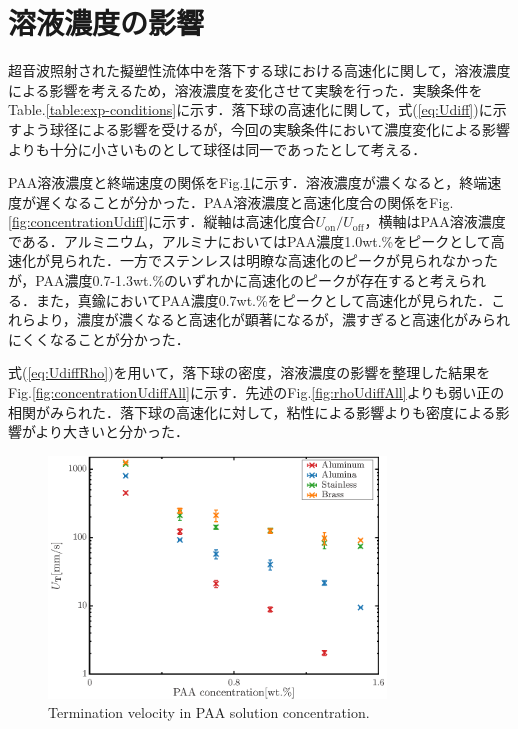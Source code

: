 \section{溶液濃度の影響}
\label{sec:concentration}
超音波照射された擬塑性流体中を落下する球における高速化に関して，溶液濃度による影響を考えるため，溶液濃度を変化させて実験を行った．実験条件をTable.\ref{table:exp-conditions}に示す．落下球の高速化に関して，式(\ref{eq:Udiff})に示すよう球径による影響を受けるが，今回の実験条件において濃度変化による影響よりも十分に小さいものとして球径は同一であったとして考える．

PAA溶液濃度と終端速度の関係をFig.\ref{fig:concentrationUT}に示す．溶液濃度が濃くなると，終端速度が遅くなることが分かった．PAA溶液濃度と高速化度合の関係をFig.\ref{fig:concentrationUdiff}に示す．縦軸は高速化度合$U_\text{on}/U_\text{off}$，横軸はPAA溶液濃度である．アルミニウム，アルミナにおいてはPAA濃度1.0wt.\%をピークとして高速化が見られた．一方でステンレスは明瞭な高速化のピークが見られなかったが，PAA濃度0.7-1.3wt.\%のいずれかに高速化のピークが存在すると考えられる．また，真鍮においてPAA濃度0.7wt.\%をピークとして高速化が見られた．これらより，濃度が濃くなると高速化が顕著になるが，濃すぎると高速化がみられにくくなることが分かった．

式(\ref{eq:UdiffRho})を用いて，落下球の密度，溶液濃度の影響を整理した結果をFig.\ref{fig:concentrationUdiffAll}に示す．先述のFig.\ref{fig:rhoUdiffAll}よりも弱い正の相関がみられた．落下球の高速化に対して，粘性による影響よりも密度による影響がより大きいと分かった．

\begin{figure}[ht]
    \centering
    \includegraphics[width=0.8\textwidth]{./5-Results/concentrationUT.eps}
    \caption{Termination velocity in PAA solution concentration.}
    \label{fig:concentrationUT}
\end{figure}

